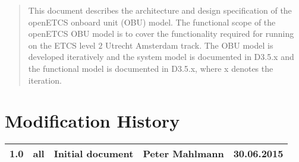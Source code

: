\documentclass{template/openetcs_report}
\begin{document}
\author{David Mentre}




\newpage


\begin{abstract}
This document describes the architecture and design specification of  the openETCS onboard unit (OBU) model. The functional scope of the openETCS OBU model is to cover the functionality required for running on the ETCS level $2$ Utrecht Amsterdam track. The OBU model is developed iteratively and the system model is documented in D3.5.x and the functional model is documented in D3.5.x, where x denotes the iteration.
\end{abstract}

\maketitle



\chapter*{Modification History}
\begin{supertabular}{| m{1.2cm} | m{1.5cm} | m{4.0cm} | m{3.5cm} | m{3.5cm} |}
1.0 & all & Initial document & Peter Mahlmann& 30.06.2015 \\\hline

\end{supertabular}

\setcounter{secnumdepth}{3}   
\setcounter{tocdepth}{3}   

\tableofcontents



\end{document}
